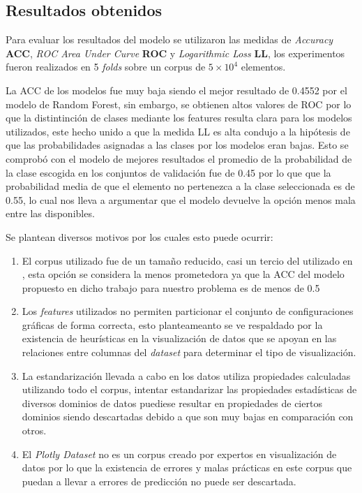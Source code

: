\documentclass[a4paper,10pt,twocolumn]{article}
\begin{document}
	\subsection{Resultados obtenidos}

	Para evaluar los resultados del modelo se utilizaron las medidas de \textit{Accuracy} \textbf{ACC},
	\textit{ROC Area Under Curve} \textbf{ROC} y \textit{Logarithmic Loss} \textbf{LL}, los experimentos
	fueron realizados en  5 \textit{folds} sobre un corpus de $5 \times 10^4$ elementos.
	
	La ACC de los modelos fue muy baja siendo el mejor resultado de 0.4552 por el modelo de Random Forest, 
	sin embargo, se obtienen altos valores de ROC por lo que la distintinci\'on de clases mediante los features
	resulta clara para los modelos utilizados, este hecho unido a que la medida LL es alta condujo a la hip\'otesis 
	de que las probabilidades asignadas a las clases por los modelos eran bajas.
	Esto se comprob\'o con el modelo de mejores resultados el promedio de la probabilidad de la clase escogida en los conjuntos de 
	validaci\'on fue de 0.45 por lo que que la probabilidad media de que el elemento no pertenezca a la clase seleccionada
	es de 0.55, lo cual nos lleva a argumentar que el modelo devuelve la opci\'on menos mala entre las disponibles.
	
	Se plantean diversos motivos por los cuales esto puede ocurrir:

	\begin{enumerate}
		\item El corpus utilizado fue de un tamaño reducido, casi un tercio del utilizado en \cite{hu2019vizml}, esta opci\'on se considera
		la menos prometedora ya que la ACC del modelo propuesto en dicho trabajo para nuestro problema es de menos de 0.5
		\item Los \textit{features} utilizados no permiten particionar el conjunto de configuraciones gr\'aficas de forma correcta, esto planteameanto
		se ve respaldado por la existencia de heur\'isticas en la visualizaci\'on de datos que se apoyan en las relaciones entre columnas del \textit{dataset}
		para determinar el tipo de visualizaci\'on.
		\item La estandarizaci\'on llevada a cabo en los datos utiliza propiedades calculadas utilizando todo el corpus, intentar estandarizar las propiedades
		estad\'isticas de diversos dominios de datos puediese resultar en propiedades de ciertos dominios siendo descartadas debido a que son muy bajas en comparaci\'on con otros.
		\item El \textit{Plotly Dataset} no es un corpus creado por expertos en visualizaci\'on de datos por lo que la existencia de errores y malas pr\'acticas en este corpus que 
		puedan a llevar a errores de predicci\'on no puede ser descartada.
	\end{enumerate}
\end{document}
